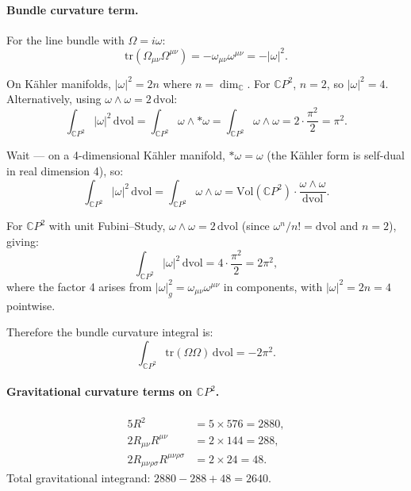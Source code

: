 \documentclass[12pt,a4paper]{article}
\begin{document}
\paragraph{Bundle curvature term.}
For the line bundle with $\Omega = i\omega$:
\begin{equation}
\mathrm{tr}(\Omega_{\mu\nu}\Omega^{\mu\nu})
= -\omega_{\mu\nu}\omega^{\mu\nu} = -|\omega|^2.
\end{equation}

On K\"ahler manifolds, $|\omega|^2 = 2n$ where $n = \dim_{\mathbb{C}}$.
For $\mathbb{C}P^2$, $n = 2$, so $|\omega|^2 = 4$.  Alternatively, using
$\omega \wedge \omega = 2\,\mathrm{dvol}$:
\begin{equation}
\int_{\mathbb{C}P^2} |\omega|^2\,\mathrm{dvol}
= \int_{\mathbb{C}P^2} \omega \wedge *\omega
= \int_{\mathbb{C}P^2} \omega \wedge \omega = 2 \cdot \frac{\pi^2}{2} = \pi^2.
\end{equation}

Wait --- on a 4-dimensional K\"ahler manifold, $*\omega = \omega$
(the K\"ahler form is self-dual in real dimension 4), so:
\begin{equation}
\int_{\mathbb{C}P^2} |\omega|^2\,\mathrm{dvol}
= \int_{\mathbb{C}P^2} \omega \wedge \omega
= \mathrm{Vol}(\mathbb{C}P^2) \cdot \frac{\omega \wedge \omega}{\mathrm{dvol}}.
\end{equation}

For $\mathbb{C}P^2$ with unit Fubini--Study, $\omega \wedge \omega = 2\,\mathrm{dvol}$
(since $\omega^n/n! = \mathrm{dvol}$ and $n = 2$), giving:
\begin{equation}
\int_{\mathbb{C}P^2} |\omega|^2\,\mathrm{dvol} = 4 \cdot \frac{\pi^2}{2} = 2\pi^2,
\end{equation}
where the factor 4 arises from $|\omega|^2_g = \omega_{\mu\nu}\omega^{\mu\nu}$
in components, with $|\omega|^2 = 2n = 4$ pointwise.

Therefore the bundle curvature integral is:
\begin{equation}\label{eq:bundle-curv-integral}
\int_{\mathbb{C}P^2} \mathrm{tr}(\Omega\Omega)\,\mathrm{dvol}
= -2\pi^2.
\end{equation}

\paragraph{Gravitational curvature terms on $\mathbb{C}P^2$.}
\begin{align}
5R^2 &= 5 \times 576 = 2880, \\
2R_{\mu\nu}R^{\mu\nu} &= 2 \times 144 = 288, \\
2R_{\mu\nu\rho\sigma}R^{\mu\nu\rho\sigma} &= 2 \times 24 = 48.
\end{align}
Total gravitational integrand: $2880 - 288 + 48 = 2640$.
\end{document}
